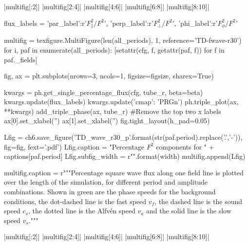 \py[chapter6]|multifig[:2]|
\py[chapter6]|multifig[2:4]|
\py[chapter6]|multifig[4:6]|
\py[chapter6]|multifig[6:8]|
\py[chapter6]|multifig[8:10]|


\begin{pycode}[chapter6]
flux_labels = {'par_label':r'$F_\parallel^2 / F^2$', 
               'perp_label':r'$F_\perp^2 / F^2$',
               'phi_label':r'$F_\phi^2 / F^2$'}

multifig = texfigure.MultiFigure(len(all_periods), 1, reference='TD-fwave-r30')
for i, paf in enumerate(all_periods):
    [setattr(cfg, f, getattr(paf, f)) for f in paf._fields]
    
    fig, ax = plt.subplots(nrows=3, ncols=1, figsize=figsize, sharex=True)
    
    kwargs = ph.get_single_percentage_flux(cfg, tube_r, beta=beta)
    kwargs.update(flux_labels)
    kwargs.update({'cmap': 'PRGn'})
    ph.triple_plot(ax, **kwargs)
    add_triple_phase(ax, tube_r)
    #Remove the top two x labels
    ax[0].set_xlabel('')
    ax[1].set_xlabel('')
    fig.tight_layout(h_pad=0.05)
    
    Lfig = ch6.save_figure('TD_wave_r30_p{}'.format(str(paf.period).replace('.','-')), fig=fig, fext='.pdf')
    Lfig.caption = "Percentage $F^2$ components for " + captions[paf.period]
    Lfig.subfig_width = r"{}\columnwidth".format(width)
    multifig.append(Lfig)

multifig.caption = r"""Percentage square wave flux along one field line is plotted over the length of the simulation, for different period and amplitude combinations. Shown in green are the phase speeds for the background conditions, the dot-dashed line is the fast speed $v_f$, the dashed line is the sound speed $c_s$, the dotted line is the Alfv\'en speed $v_a$ and the solid line is the slow speed $v_s$."""

\end{pycode}


\py[chapter6]|multifig[:2]|
\py[chapter6]|multifig[2:4]|
\py[chapter6]|multifig[4:6]|
\py[chapter6]|multifig[6:8]|
\py[chapter6]|multifig[8:10]|


